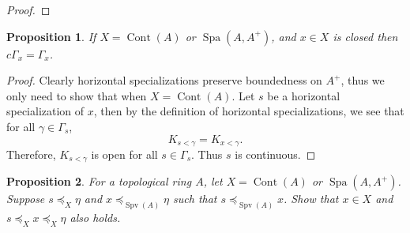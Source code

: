 \documentclass[8pt]{article}
\numberwithin{equation}{section}
\newtheorem{proposition}{Proposition}[subsection]
\newtheorem{remark}{Remark}[subsection]
\DeclareMathOperator{\Spa}{Spa}
\DeclareMathOperator{\glim}{glim}
\DeclareMathOperator{\Spv}{Spv}
\DeclareMathOperator{\Cont}{Cont}
\newcommand{\Ouv}{\mathscr{O}}
\newcommand{\norm}[1]{\Vert #1 \Vert}
\newcommand{\U}[0]{\mathcal{U}}
\newcommand{\T}[0]{\mathbb{T}}
\newcommand{\ab}[1]{\vert #1 \vert}
\newcommand{\cGamma}[0]{c\Gamma}
\begin{document}
\begin{proof}
\end{proof}



\begin{proposition}
    \label{fact_15_11}
    If $X = \Cont(A)$ or $\Spa(A,A^+)$, and $x\in X$ is closed then $\cGamma_x = \Gamma_x$.
\end{proposition}
\begin{proof}
    Clearly horizontal specializations preserve boundedness on $A^+$, thus we only need to show that when $X=\Cont(A)$. Let $s$ be a horizontal specialization of $x$, then by the definition of horizontal specializations, we see that for all $\gamma\in\Gamma_s$, 
    \begin{equation*}
        K_{s<\gamma} = K_{x<\gamma}.
    \end{equation*}
    Therefore, $K_{s<\gamma}$ is open for all $s\in\Gamma_s$. Thus $s$ is continuous.
\end{proof}

\begin{proposition}
    \label{fact_15_12}
    For a topological ring $A$, let $X = \Cont(A)$ or $\Spa(A,A^+)$. Suppose $s\preceq_X \eta$ and $x\preceq_{\Spv(A)}\eta$ such that $s\preceq_{\Spv(A)}x$. %
    Show that $x\in X$ and $s\preceq_X x\preceq_X \eta$ also holds.
\end{proposition}
\end{document}
